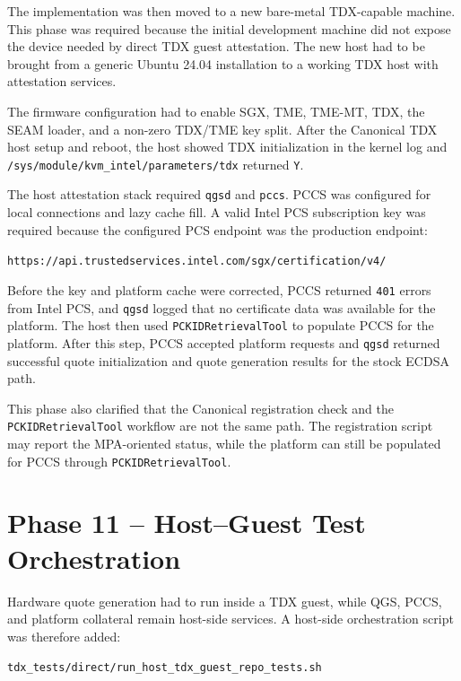 The implementation was then moved to a new bare-metal TDX-capable machine.
This phase was required because the initial development machine did not expose
the device needed by direct TDX guest attestation. The new host had to be
brought from a generic Ubuntu 24.04 installation to a working TDX host with
attestation services.

The firmware configuration had to enable SGX, TME, TME-MT, TDX, the SEAM
loader, and a non-zero TDX/TME key split. After the Canonical TDX host setup
and reboot, the host showed TDX initialization in the kernel log and
\texttt{/sys/module/kvm\_intel/parameters/tdx} returned \texttt{Y}.

The host attestation stack required \texttt{qgsd} and \texttt{pccs}. PCCS was
configured for local connections and lazy cache fill. A valid Intel PCS
subscription key was required because the configured PCS endpoint was the
production endpoint:

\begin{center}
\texttt{https://api.trustedservices.intel.com/sgx/certification/v4/}
\end{center}

Before the key and platform cache were corrected, PCCS returned \texttt{401}
errors from Intel PCS, and \texttt{qgsd} logged that no certificate data was
available for the platform. The host then used \texttt{PCKIDRetrievalTool} to
populate PCCS for the platform. After this step, PCCS accepted platform
requests and \texttt{qgsd} returned successful quote initialization and quote
generation results for the stock ECDSA path.

This phase also clarified that the Canonical registration check and the
\texttt{PCKIDRetrievalTool} workflow are not the same path. The registration
script may report the MPA-oriented status, while the platform can still be
populated for PCCS through \texttt{PCKIDRetrievalTool}.

\section{Phase 11 -- Host--Guest Test Orchestration}

Hardware quote generation had to run inside a TDX guest, while QGS, PCCS, and
platform collateral remain host-side services. A host-side orchestration script
was therefore added:

\begin{center}
\texttt{tdx\_tests/direct/run\_host\_tdx\_guest\_repo\_tests.sh}
\end{center}

